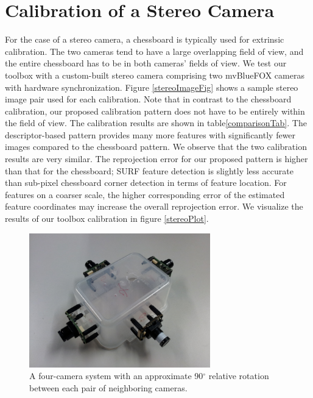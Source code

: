 \documentclass{report}
\begin{document}
\section{Calibration of a Stereo Camera}
For the case of a stereo camera, a chessboard is typically used for extrinsic calibration. The two cameras tend to have a large overlapping field of view, and the entire chessboard has to be in both cameras' fields of view. We test our toolbox with a custom-built stereo camera comprising two mvBlueFOX cameras with hardware synchronization. Figure \ref{stereoImageFig} shows a sample stereo image pair used for each calibration. Note that in contrast to the chessboard calibration, our proposed calibration pattern does not have to be entirely within the field of view. The calibration results are shown in table\ref{comparisonTab}. The descriptor-based pattern provides many more features with significantly fewer images compared to the chessboard pattern. We observe that the two calibration results are very similar. The reprojection error for our proposed pattern is higher than that for the chessboard; SURF feature detection is slightly less accurate than sub-pixel chessboard corner detection in terms of feature location. For features on a coarser scale, the higher corresponding error of the estimated feature coordinates may increase the overall reprojection error. We visualize the results of our toolbox calibration in figure \ref{stereoPlot}.


\begin{figure}
\centering
\includegraphics[width=0.7\textwidth]{images/fourcamerarig}
\caption{A four-camera system with an approximate 90\ensuremath{^\circ} relative rotation between each pair of neighboring cameras.}
\label{fourCameraRigPhoto}
\end{figure}
\end{document}

